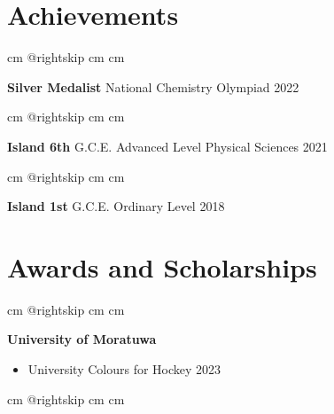 \documentclass[10pt, a4paper]{article}
\newenvironment{highlights}{
        \begin{itemize}[
                topsep=0pt,
                parsep=0.10 cm,
                partopsep=0pt,
                itemsep=0pt,
                after=\vspace{-1\baselineskip},
                leftmargin=0.4 cm + 3pt
            ]
    }{
        \end{itemize}
    } %
\begin{document}
    \section{Achievements}

        \begingroup{} cm
        \advance\csname @rightskip cm
        \advance{} cm

        \textbf{Silver Medalist} National Chemistry Olympiad 2022 \par\endgroup

        \vspace{0.2 cm}
        \begingroup{} cm
        \advance\csname @rightskip cm
        \advance{} cm

        \textbf{Island 6th} G.C.E. Advanced Level Physical Sciences 2021 \par\endgroup
        
         \vspace{0.2 cm}
        \begingroup{} cm
        \advance\csname @rightskip cm
        \advance{} cm

        \textbf{Island 1st} G.C.E. Ordinary Level 2018 \par\endgroup

    \section{Awards and Scholarships}

        \begingroup{} cm
        \advance\csname @rightskip cm
        \advance{} cm

        \textbf{University of Moratuwa}  \begin{highlights}
		\item University Colours for Hockey 2023
	\end{highlights}
        \par\endgroup

        \vspace{0.6 cm}
        \begingroup{} cm
        \advance\csname @rightskip cm
        \advance{} cm
\end{document}
